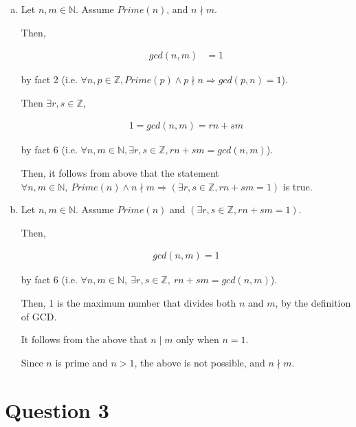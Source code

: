 \documentclass[12pt]{article}
\begin{document}
\begin{enumerate}[a.]
    \item

    Let $n,m \in \mathbb{N}$. Assume $Prime(n)$, and $n \nmid m$.

    \bigskip

    Then,

    \begin{align}
        gcd(n,m) &= 1
    \end{align}

    by fact 2 (i.e. $\forall n,p \in \mathbb{Z}, Prime(p) \land p \nmid n \Rightarrow
    gcd(p,n) = 1$).

    \bigskip

    Then $\exists r,s \in \mathbb{Z}$,

    \begin{align}
        1 = gcd(n,m) = rn + sm
    \end{align}

    by fact 6 (i.e. $\forall n,m \in \mathbb{N}, \exists r,s \in \mathbb{Z},
    rn+sm = gcd(n,m)$).

    \bigskip

    Then, it follows from above that the statement $\forall n,m \in \mathbb{N},\:
    Prime(n) \land n \nmid m \Rightarrow (\exists r,s \in \mathbb{Z}, rn+sm = 1)$ is
    true.

    \item

    Let $n,m \in \mathbb{N}$. Assume $Prime(n)$ and $(\exists r,s \in \mathbb{Z}, rn+sm = 1)$.

    \bigskip

    Then,

    \begin{align}
        gcd(n,m) = 1
    \end{align}

    by fact 6 (i.e. $\forall n,m \in \mathbb{N},\:\exists r,s \in \mathbb{Z},\: rn+sm = gcd(n,m)$).

    \bigskip

    Then, 1 is the maximum number that divides both $n$ and $m$, by the definition
    of GCD.

    \bigskip

    It follows from the above that $n \mid m$ only when $n = 1$.

    \bigskip

    Since $n$ is prime and $n > 1$, the above is not possible, and $n \nmid m$.


\end{enumerate}


\section*{Question 3}
\end{document}
